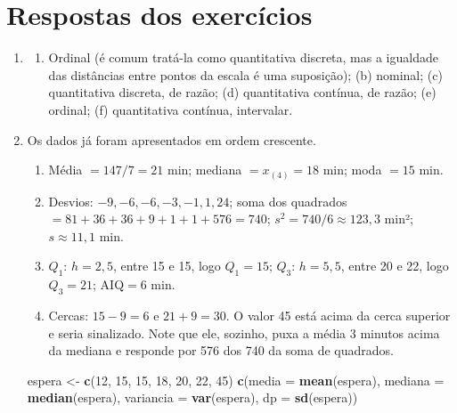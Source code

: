 \documentclass[
]{book}
\newenvironment{Shaded}{\begin{snugshade}}{\end{snugshade}}
\newcommand{\AttributeTok}[1]{\textcolor[rgb]{0.13,0.29,0.53}{#1}}
\newcommand{\DecValTok}[1]{\textcolor[rgb]{0.00,0.00,0.81}{#1}}
\newcommand{\FunctionTok}[1]{\textcolor[rgb]{0.13,0.29,0.53}{\textbf{#1}}}
\newcommand{\NormalTok}[1]{#1}
\newcommand{\OtherTok}[1]{\textcolor[rgb]{0.56,0.35,0.01}{#1}}
\providecommand{\tightlist}{%
  \setlength{\itemsep}{0pt}\setlength{\parskip}{0pt}}
\begin{document}
\section{Respostas dos exercícios}\label{respostas-dos-exercuxedcios-3}

\begin{enumerate}
\def\labelenumi{\arabic{enumi}.}
\item
  \begin{enumerate}
  \def\labelenumii{(\alph{enumii})}
  \tightlist
  \item
    Ordinal (é comum tratá-la como quantitativa discreta, mas a igualdade das distâncias entre pontos da escala é uma suposição); (b) nominal; (c) quantitativa discreta, de razão; (d) quantitativa contínua, de razão; (e) ordinal; (f) quantitativa contínua, intervalar.
  \end{enumerate}
\item
  Os dados já foram apresentados em ordem crescente.

  \begin{enumerate}
  \def\labelenumii{\alph{enumii})}
  \tightlist
  \item
    Média \(= 147/7 = 21\) min; mediana \(= x_{(4)} = 18\) min; moda \(= 15\) min.
  \item
    Desvios: \(-9, -6, -6, -3, -1, 1, 24\); soma dos quadrados \(= 81 + 36 + 36 + 9 + 1 + 1 + 576 = 740\); \(s^2 = 740/6 \approx 123{,}3\) min²; \(s \approx 11{,}1\) min.
  \item
    \(Q_1\): \(h = 2{,}5\), entre 15 e 15, logo \(Q_1 = 15\); \(Q_3\): \(h = 5{,}5\), entre 20 e 22, logo \(Q_3 = 21\); \(\text{AIQ} = 6\) min.
  \item
    Cercas: \(15 - 9 = 6\) e \(21 + 9 = 30\). O valor 45 está acima da cerca superior e seria sinalizado. Note que ele, sozinho, puxa a média 3 minutos acima da mediana e responde por 576 dos 740 da soma de quadrados.
  \end{enumerate}

\begin{Shaded}
\begin{Highlighting}[]
\NormalTok{espera }\OtherTok{\textless{}{-}} \FunctionTok{c}\NormalTok{(}\DecValTok{12}\NormalTok{, }\DecValTok{15}\NormalTok{, }\DecValTok{15}\NormalTok{, }\DecValTok{18}\NormalTok{, }\DecValTok{20}\NormalTok{, }\DecValTok{22}\NormalTok{, }\DecValTok{45}\NormalTok{)}
\FunctionTok{c}\NormalTok{(}\AttributeTok{media =} \FunctionTok{mean}\NormalTok{(espera), }\AttributeTok{mediana =} \FunctionTok{median}\NormalTok{(espera), }\AttributeTok{variancia =} \FunctionTok{var}\NormalTok{(espera), }\AttributeTok{dp =} \FunctionTok{sd}\NormalTok{(espera))}
\end{Highlighting}
\end{Shaded}


\end{enumerate}
\end{document}
